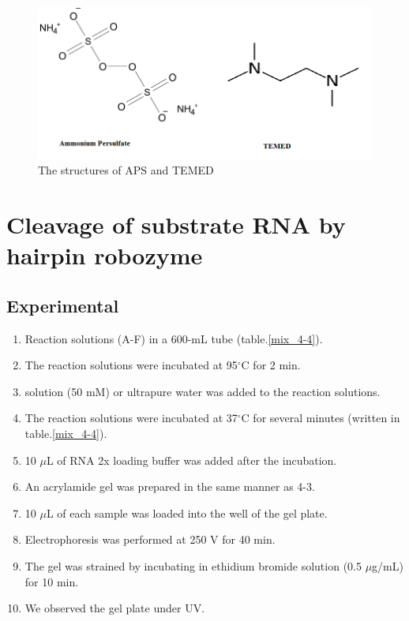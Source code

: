 \documentclass{ltjsarticle}
\theoremstyle{definition}
\numberwithin{equation}{section}
\newcommand{\D}{^\circ\text{C}}
\begin{document}
\begin{figure}[htbp]
\begin{center}
\includegraphics[width = 10 cm]{structure.png}
\caption{The structures of APS and TEMED}
\label{APS}
\end{center}
\end{figure}


\newpage
\section{Cleavage of substrate RNA by hairpin robozyme}
\subsection{Experimental}
\begin{enumerate}
\item Reaction solutions (A-F) in a 600-mL tube (table.\ref{mix_4-4}).
\item The reaction solutions were incubated at 95$\D$ for 2 min. 
\item {} solution (50 mM) or ultrapure water was added to the reaction solutions.
\item The reaction solutions were incubated at 37$\D$ for several minutes (written in table.\ref{mix_4-4}).
\item 10 $\mu$L of RNA 2x loading buffer was added after the incubation.
\item An acrylamide gel was prepared in the same manner as 4-3.
\item 10 $\mu$L of each sample was loaded into the well of the gel plate.
\item Electrophoresis was performed at 250 V for 40 min.
\item The gel was strained by incubating in ethidium bromide solution (0.5 $\mu$g/mL) for 10 min.
\item We observed the gel plate under UV.
\end{enumerate}
\end{document}
